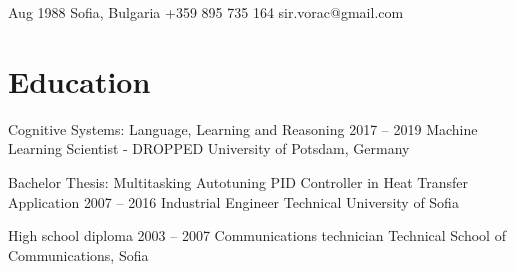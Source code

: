 \documentclass{tccv}
\begin{document}
\mypersonal
    {Aug 1988}
    {Sofia, Bulgaria}
    {+359 895 735 164}
    {sir.vorac@gmail.com}

\section{Education}
\begin{yearlist}
\item[{\footnotesize Cognitive Systems: Language, Learning and Reasoning}]
     {2017 -- 2019}
     {Machine Learning Scientist - DROPPED}
     {University of Potsdam, Germany}

\item[Bachelor Thesis:                 \newline
     {\footnotesize Multitasking Autotuning PID Controller in Heat Transfer Application}]
     {2007 -- 2016}
     {Industrial Engineer}
     {Technical University of Sofia}

\item[High school diploma]{2003 -- 2007}
     {Communications technician}
     {Technical School of Communications, Sofia}
\end{yearlist}


\newpage
\end{document}
